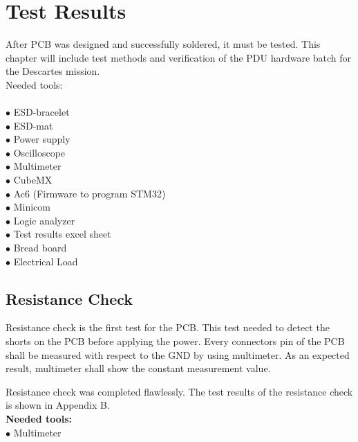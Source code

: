 \chapter{Test Results \label{6}}
After PCB was designed and successfully soldered, it must be tested.
This chapter will include test methods and verification of the PDU hardware batch for the Descartes mission.
\\
Needed tools:\\ \\
$\bullet$ ESD-bracelet\\
$\bullet$ ESD-mat\\
$\bullet$ Power supply\\
$\bullet$ Oscilloscope\\
$\bullet$ Multimeter\\
$\bullet$ CubeMX\\
$\bullet$ Ac6 (Firmware to program STM32)\\
$\bullet$ Minicom\\
$\bullet$ Logic analyzer\\
$\bullet$ Test results excel sheet\\
$\bullet$ Bread board\\
$\bullet$ Electrical Load\\



\section{Resistance Check}


Resistance check is the first test for the PCB. This test needed to detect the shorts on the PCB before applying the power.
Every connectors pin of the PCB shall be measured with respect to the GND by using multimeter. As an expected result, multimeter shall show the constant measurement value.

Resistance check was completed flawlessly. The test results of the resistance check is shown in Appendix B.\\

\textbf{Needed tools:}\\
$\bullet$ Multimeter

